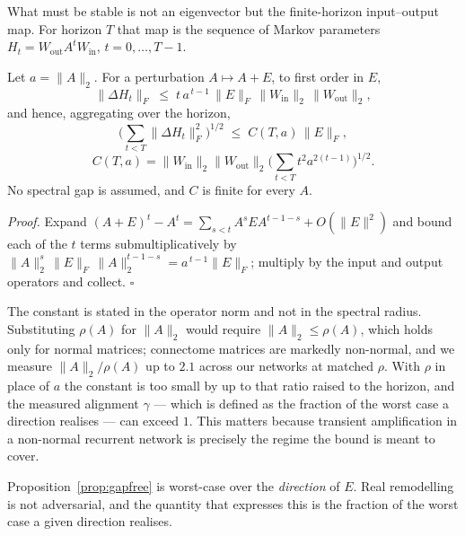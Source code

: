 What must be stable is not an eigenvector but the finite-horizon input--output map.
For horizon $T$ that map is the sequence of Markov parameters $H_t = W_{\mathrm{out}}
A^{t} W_{\mathrm{in}}$, $t = 0,\dots,T-1$.

\begin{proposition}
\label{prop:gapfree}
Let $a = \|A\|_2$. For a perturbation $A \mapsto A + E$, to first order in $E$,
\begin{equation}
\|\Delta H_t\|_F \;\le\; t\,a^{\,t-1}\,\|E\|_F\,\|W_{\mathrm{in}}\|_2\,\|W_{\mathrm{out}}\|_2 ,
\end{equation}
and hence, aggregating over the horizon,
\begin{equation}
\Big(\textstyle\sum_{t<T} \|\Delta H_t\|_F^{2}\Big)^{1/2} \;\le\; C(T,a)\,\|E\|_F,
\end{equation}
\begin{equation}
C(T,a) = \|W_{\mathrm{in}}\|_2 \|W_{\mathrm{out}}\|_2
         \Big(\textstyle\sum_{t<T} t^{2}a^{2(t-1)}\Big)^{1/2}.
\end{equation}
No spectral gap is assumed, and $C$ is finite for every $A$.
\end{proposition}

\noindent\emph{Proof.} Expand $(A+E)^{t} - A^{t} = \sum_{s<t} A^{s} E A^{t-1-s} +
O(\|E\|^{2})$ and bound each of the $t$ terms submultiplicatively by
$\|A\|_2^{s}\,\|E\|_F\,\|A\|_2^{t-1-s} = a^{\,t-1}\|E\|_F$; multiply by the input and
output operators and collect. \hfill$\square$

\begin{remark}
The constant is stated in the operator norm and not in the spectral radius. Substituting
$\rho(A)$ for $\|A\|_2$ would require $\|A\|_2 \le \rho(A)$, which holds only for normal
matrices; connectome matrices are markedly non-normal, and we measure
$\|A\|_2/\rho(A)$ up to $2.1$ across our networks at matched $\rho$. With $\rho$ in
place of $a$ the constant is too small by up to that ratio raised to the horizon, and
the measured alignment $\gamma$ --- which is defined as the fraction of the worst case
a direction realises --- can exceed $1$. This matters because transient amplification
in a non-normal recurrent network is precisely the regime the bound is meant to cover.
\end{remark}

Proposition~\ref{prop:gapfree} is worst-case over the \emph{direction} of $E$. Real
remodelling is not adversarial, and the quantity that expresses this is the fraction
of the worst case a given direction realises.

